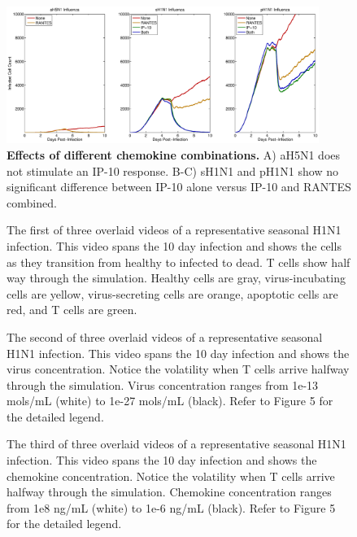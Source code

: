 \documentclass[10pt]{article}
\begin{document}
\begin{figure}[!ht]
\begin{center}
\includegraphics[width=4in]{Figure_S2}
 \end{center}
\caption{\textbf{Effects of different chemokine combinations.}  A) aH5N1 does not stimulate an IP-10 response.  B-C) sH1N1 and pH1N1 show no significant difference between IP-10 alone versus IP-10 and RANTES combined.} 
 \label{fig:sensitivity}
\end{figure}

\setcounter{figure}{0}
\renewcommand{\figurename}{Video}

\begin{figure}[ht!]
\caption{The first of three overlaid videos of a representative seasonal H1N1 infection.  This video spans the 10 day infection and shows the cells as they transition from healthy to infected to dead.  T cells show half way through the simulation.  Healthy cells are gray, virus-incubating cells are yellow, virus-secreting cells are orange, apoptotic cells are red, and T cells are green.} 
 \label{video:cell_view}
\end{figure}

\begin{figure}[ht!]
\caption{The second of three overlaid videos of a representative seasonal H1N1 infection.  This video spans the 10 day infection and shows the virus concentration.  Notice the volatility when T cells arrive halfway through the simulation.  Virus concentration ranges from 1e-13 mols/mL (white) to 1e-27 mols/mL (black).  Refer to Figure 5 for the detailed legend. } 
 \label{video:virus_view}
\end{figure}

\begin{figure}[ht!]
\caption{The third of three overlaid videos of a representative seasonal H1N1 infection.  This video spans the 10 day infection and shows the chemokine concentration.  Notice the volatility when T cells arrive halfway through the simulation.  Chemokine concentration ranges from 1e8 ng/mL (white) to 1e-6 ng/mL (black).  Refer to Figure 5 for the detailed legend. } 
 \label{video:chemokine_view}
\end{figure}
\end{document}
